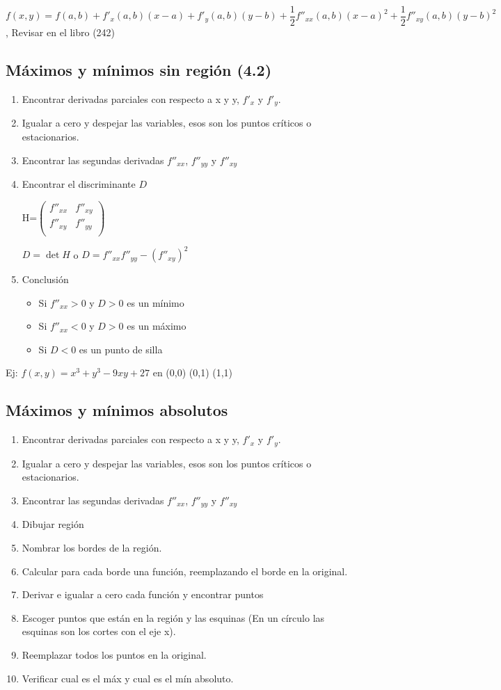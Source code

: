 $f(x,y)=f(a,b)+f'_x(a,b)(x-a)+f'_y(a,b)(y-b)+\dfrac{1}{2}f''_{xx}(a,b)(x-a)^2+\dfrac{1}{2}f''_{xy}(a,b)(y-b)^2$, Revisar en el libro (242)

\subsection{Máximos y mínimos sin región (4.2)}
\begin{enumerate}
	\item Encontrar derivadas parciales con respecto a x y y, $f'_{x}$ y $f'_{y}$.
	\item Igualar a cero y despejar las variables, esos son los puntos críticos o estacionarios.
	\item Encontrar las segundas derivadas $f''_{xx}$, $f''_{yy}$ y $f''_{xy}$
	\item Encontrar el discriminante $D$
	
	H=$\begin{pmatrix}
	f''_{xx} & f''_{xy} \\
	f''_{xy} & f''_{yy} \\
	\end{pmatrix}$
	
	$D=\det H$ o $D = f''_{xx}f''_{yy}-(f''_{xy})^2$
	\item Conclusión 
	\begin{itemize}
		\item Si $f''_{xx}>0$ y $D>0$ es un mínimo
		\item Si $f''_{xx}<0$ y $D>0$ es un máximo
		\item Si $D<0$ es un punto de silla
	\end{itemize}
\end{enumerate}

Ej: $f(x,y)=x^3+y^3-9xy+27$ en (0,0) (0,1) (1,1)

\subsection{Máximos y mínimos absolutos}

\begin{enumerate}
	\item Encontrar derivadas parciales con respecto a x y y, $f'_{x}$ y $f'_{y}$.
	\item Igualar a cero y despejar las variables, esos son los puntos críticos o estacionarios.
	\item Encontrar las segundas derivadas $f''_{xx}$, $f''_{yy}$ y $f''_{xy}$
	\item Dibujar región
	\item Nombrar los bordes de la región.
	\item Calcular para cada borde una función, reemplazando el borde en la original.
	\item Derivar e igualar a cero cada función y encontrar puntos
	\item Escoger puntos que están en la región y las esquinas (En un círculo las esquinas son los cortes con el eje x).
	\item Reemplazar todos los puntos en la original.
	\item Verificar cual es el máx y cual es el mín absoluto. 
\end{enumerate}

